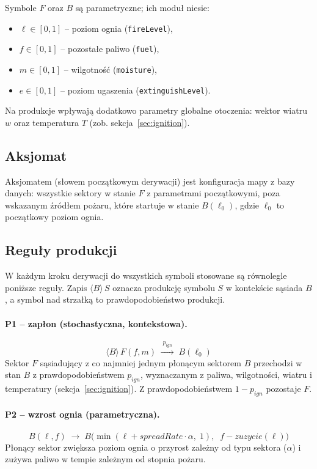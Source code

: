 Symbole $F$ oraz $B$ są parametryczne; ich moduł niesie:
\begin{itemize}
  \item $\ell \in [0,1]$ -- poziom ognia (\texttt{fireLevel}),
  \item $f \in [0,1]$ -- pozostałe paliwo (\texttt{fuel}),
  \item $m \in [0,1]$ -- wilgotność (\texttt{moisture}),
  \item $e \in [0,1]$ -- poziom ugaszenia (\texttt{extinguishLevel}).
\end{itemize}
Na produkcje wpływają dodatkowo parametry globalne otoczenia: wektor wiatru $w$ oraz temperatura $T$ (zob. sekcja~\ref{sec:ignition}).

\subsection{Aksjomat}

Aksjomatem (słowem początkowym derywacji) jest konfiguracja mapy z bazy danych: wszystkie sektory w stanie $F$ z parametrami początkowymi, poza wskazanym źródłem pożaru, które startuje w stanie $B(\ell_0)$, gdzie $\ell_0$ to początkowy poziom ognia.

\subsection{Reguły produkcji}

W każdym kroku derywacji do wszystkich symboli stosowane są równolegle poniższe reguły. Zapis $\langle B \rangle\, S$ oznacza produkcję symbolu $S$ w kontekście sąsiada $B$, a symbol nad strzałką to prawdopodobieństwo produkcji.

\paragraph{P1 -- zapłon (stochastyczna, kontekstowa).}
\begin{equation}
\langle B \rangle\, F(f,m) \;\xrightarrow{\;p_{ign}\;}\; B(\ell_0)
\end{equation}
Sektor $F$ sąsiadujący z co najmniej jednym płonącym sektorem $B$ przechodzi w stan $B$ z prawdopodobieństwem $p_{ign}$, wyznaczanym z paliwa, wilgotności, wiatru i temperatury (sekcja~\ref{sec:ignition}). Z prawdopodobieństwem $1 - p_{ign}$ pozostaje $F$.

\paragraph{P2 -- wzrost ognia (parametryczna).}
\begin{equation}
B(\ell, f) \;\rightarrow\; B\Big(\min(\ell + spreadRate\cdot\alpha,\; 1),\;\; f - \mathit{zuzycie}(\ell)\Big)
\end{equation}
Płonący sektor zwiększa poziom ognia o przyrost zależny od typu sektora ($\alpha$) i zużywa paliwo w tempie zależnym od stopnia pożaru.

